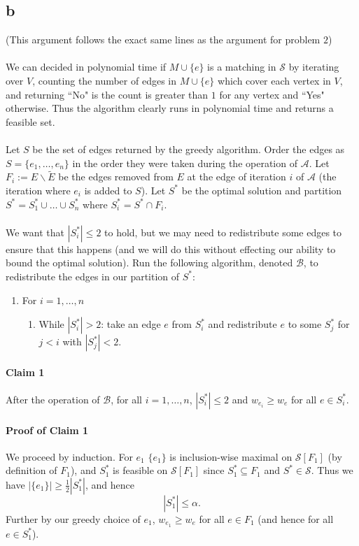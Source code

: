 \documentclass[letterpaper,12pt,oneside,onecolumn]{article}
\newcommand{\cA}{\mathcal{A}} \newcommand{\cB}{\mathcal{B}}
\newcommand{\cS}{\mathcal{S}} \newcommand{\cT}{\mathcal{T}}
\begin{document}
\subsection{b}
(This argument follows the exact same lines as the argument for problem $2$)
\paragraph{}
We can decided in polynomial time if $M\cup \{e\}$ is a matching in $\cS$ by iterating over $V$, counting the number of edges in $M\cup\{e\}$ which cover each vertex in $V$, and returning ``No" is the count is greater than $1$ for any vertex and ``Yes" otherwise. Thus the algorithm clearly runs in polynomial time and returns a feasible set.
\paragraph{}
Let $S$ be the set of edges returned by the greedy algorithm. Order the edges as $S = \{e_1, \dots, e_n\}$ in the order they were taken during the operation of $\cA$. Let $F_i := E\backslash \tilde{E}$ be the edges removed from $E$ at the edge of iteration $i$ of $\cA$ (the iteration where $e_i$ is added to $S$). Let $S^*$ be the optimal solution and partition $S^* = S^*_1 \cup \dots \cup S^*_n$ where $S^*_i = S^* \cap F_i$.
\paragraph{}
We want that $|S^*_i| \leq 2$ to hold, but we may need to redistribute some edges to ensure that this happens (and we will do this without effecting our ability to bound the optimal solution). Run the following algorithm, denoted $\cB$, to redistribute the edges in our partition of $S^*$:
\begin{enumerate}
\item For $i = 1, \dots, n$
\begin{enumerate}
\item While $|S^*_i| > 2$: take an edge $e$ from $S^*_i$ and redistribute $e$ to some $S^*_j$ for $j<i$ with $|S^*_j| < 2$.
\end{enumerate}
\end{enumerate}
\paragraph{Claim 1}
After the operation of $\cB$, for all $i = 1, \dots, n$, $|S^*_i| \leq 2$ and $w_{e_i} \geq w_e$ for all $e \in S^*_i$.
\paragraph{Proof of Claim 1}
We proceed by induction. For $e_1$ $\{e_1\}$ is inclusion-wise maximal on $\cS[F_1]$ (by definition of $F_1$), and $S_1^*$ is feasible on $\cS[F_1]$ since $S^*_1 \subseteq F_1$ and $S^* \in \cS$. Thus we have $|\{e_1\}| \geq \frac{1}{2} |S_1^*|$, and hence
$$|S^*_1| \leq \alpha.$$
Further by our greedy choice of $e_1$, $w_{e_1} \geq w_e$ for all $e \in F_1$ (and hence for all $e \in S^*_1$).
\end{document}
